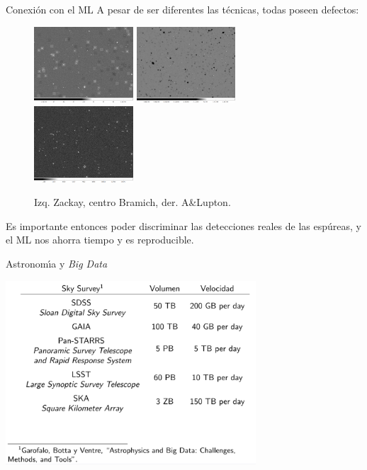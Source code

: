 \documentclass[11pt]{beamer}
\begin{document}
\begin{frame}{Conexi\'on con el ML}
    A pesar de ser diferentes las t\'ecnicas, 
    todas poseen defectos:
    \begin{figure}
        \centering
        \includegraphics[width=0.33\textwidth]{images/diff.png}
        \includegraphics[width=0.33\textwidth]{images/diff_ois.png}
        \includegraphics[width=0.33\textwidth]{images/diff_hot.png}
        \caption{Izq. Zackay, centro Bramich, der. A\&Lupton.}
        \label{fig:restas}
    \end{figure}
    
    Es importante entonces poder discriminar las detecciones reales de las esp\'ureas,
    y el ML nos ahorra tiempo y es reproducible.
    \end{frame}

\begin{frame}{Astronom\'{\i}a y \textit{Big Data}}
\begin{center}
\includegraphics[width=0.7\textwidth]{images/tab_big_data.png}
\end{center}
\end{frame}
\end{document}
